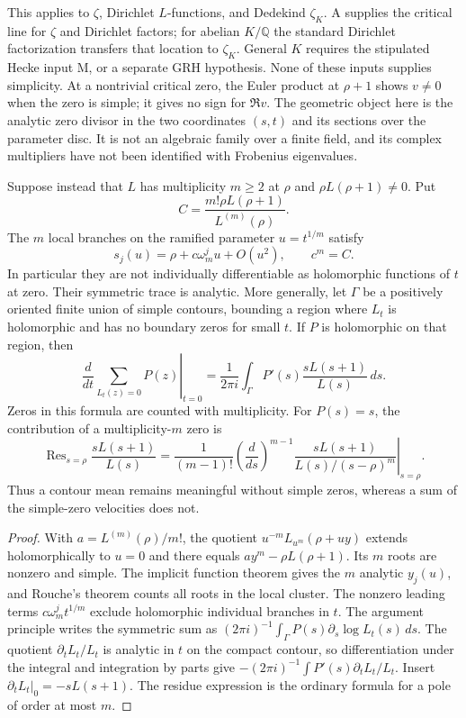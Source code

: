 This applies to $\zeta$, Dirichlet $L$-functions, and Dedekind $\zeta_K$.
A supplies the critical line for $\zeta$ and Dirichlet factors; for abelian
$K/\mathbb Q$ the standard Dirichlet factorization transfers that location
to $\zeta_K$. General $K$ requires the stipulated Hecke input M, or a
separate GRH hypothesis. None of these inputs supplies simplicity. At a
nontrivial critical zero, the Euler product at $\rho+1$ shows $v\ne0$
when the zero is simple; it gives no sign for $\Re v$.
The geometric object here is the analytic zero divisor in the two
coordinates $(s,t)$ and its sections over the parameter disc. It is not
an algebraic family over a finite field, and its complex multipliers have
not been identified with Frobenius eigenvalues.

\begin{theorem}
Suppose instead that $L$ has multiplicity $m\ge2$ at $\rho$ and
$\rho L(\rho+1)\ne0$. Put
\[
 C=\frac{m!\rho L(\rho+1)}{L^{(m)}(\rho)}.
\]
The $m$ local branches on the ramified parameter $u=t^{1/m}$ satisfy
\[
 s_j(u)=\rho+c\omega_m^j u+O(u^2),\qquad c^m=C.
\]
In particular they are not individually differentiable as holomorphic
functions of $t$ at zero. Their symmetric trace is analytic. More
generally, let $\Gamma$ be a positively oriented finite union of simple
contours, bounding a region where $L_t$ is holomorphic and has no boundary
zeros for small $t$. If $P$ is holomorphic on that region, then
\[
 \left.\frac d{dt}\sum_{L_t(z)=0}P(z)\right|_{t=0}
 =\frac1{2\pi i}\int_\Gamma
 P'(s)\frac{sL(s+1)}{L(s)}\,ds.
\]
Zeros in this formula are counted with multiplicity. For $P(s)=s$, the
contribution of a multiplicity-$m$ zero is
\[
 \operatorname{Res}_{s=\rho}\frac{sL(s+1)}{L(s)}
 =\frac1{(m-1)!}
 \left.\left(\frac d{ds}\right)^{m-1}
 \frac{sL(s+1)}{L(s)/(s-\rho)^m}\right|_{s=\rho}.
\]
Thus a contour mean remains meaningful without simple zeros, whereas a
sum of the simple-zero velocities does not.
\end{theorem}
\begin{proof}
With $a=L^{(m)}(\rho)/m!$, the quotient
$u^{-m}L_{u^m}(\rho+uy)$ extends holomorphically to $u=0$ and there
equals $ay^m-\rho L(\rho+1)$. Its $m$ roots are nonzero and simple.
The implicit function theorem gives the $m$ analytic $y_j(u)$, and
Rouche's theorem counts all roots in the local cluster. The nonzero
leading terms $c\omega_m^j t^{1/m}$ exclude holomorphic individual
branches in $t$.
The argument principle writes the symmetric sum as
$(2\pi i)^{-1}\int_\Gamma P(s)\partial_s\log L_t(s)\,ds$.
The quotient $\partial_tL_t/L_t$ is analytic in $t$ on the compact
contour, so differentiation under the integral and integration by parts
give $-(2\pi i)^{-1}\int P'(s)\partial_tL_t/L_t$. Insert
$\partial_tL_t|_0=-sL(s+1)$. The residue expression is the ordinary
formula for a pole of order at most $m$.
\end{proof}

